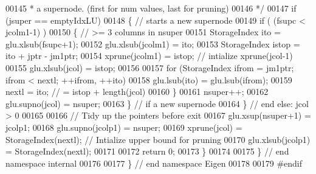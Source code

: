 \begin{DoxyCode}
00145 \textcolor{comment}{     * a supernode. (first for num values, last for pruning)}
00146 \textcolor{comment}{     */}
00147     \textcolor{keywordflow}{if} (jsuper == emptyIdxLU)
00148     \{ \textcolor{comment}{// starts a new supernode }
00149       \textcolor{keywordflow}{if} ( (fsupc < jcolm1-1) ) 
00150       \{ \textcolor{comment}{// >= 3 columns in nsuper}
00151         StorageIndex ito = glu.xlsub(fsupc+1);
00152         glu.xlsub(jcolm1) = ito; 
00153         StorageIndex istop = ito + jptr - jm1ptr; 
00154         xprune(jcolm1) = istop; \textcolor{comment}{// intialize xprune(jcol-1)}
00155         glu.xlsub(jcol) = istop; 
00156         
00157         \textcolor{keywordflow}{for} (StorageIndex ifrom = jm1ptr; ifrom < nextl; ++ifrom, ++ito)
00158           glu.lsub(ito) = glu.lsub(ifrom); 
00159         nextl = ito;  \textcolor{comment}{// = istop + length(jcol)}
00160       \}
00161       nsuper++; 
00162       glu.supno(jcol) = nsuper; 
00163     \} \textcolor{comment}{// if a new supernode }
00164   \} \textcolor{comment}{// end else:  jcol > 0}
00165   
00166   \textcolor{comment}{// Tidy up the pointers before exit}
00167   glu.xsup(nsuper+1) = jcolp1; 
00168   glu.supno(jcolp1) = nsuper; 
00169   xprune(jcol) = StorageIndex(nextl);  \textcolor{comment}{// Intialize upper bound for pruning}
00170   glu.xlsub(jcolp1) = StorageIndex(nextl); 
00171   
00172   \textcolor{keywordflow}{return} 0; 
00173 \}
00174 
00175 \} \textcolor{comment}{// end namespace internal}
00176 
00177 \} \textcolor{comment}{// end namespace Eigen}
00178 
00179 \textcolor{preprocessor}{#endif}
\end{DoxyCode}
